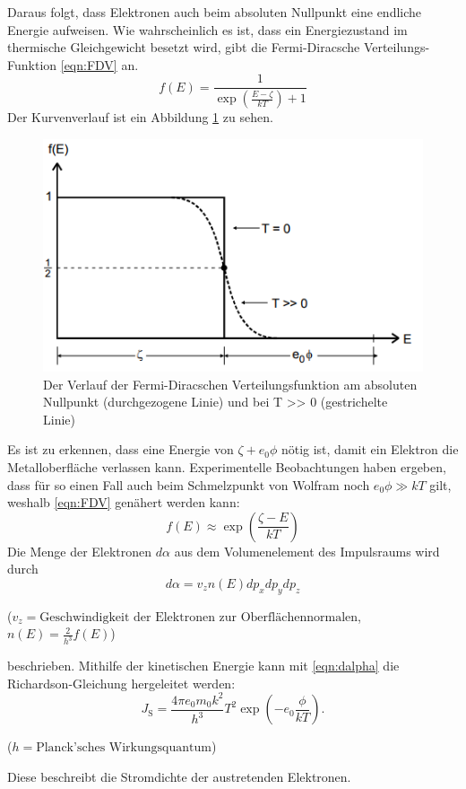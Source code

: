 Daraus folgt, dass Elektronen auch beim absoluten Nullpunkt eine endliche Energie aufweisen.
Wie wahrscheinlich es ist, dass ein Energiezustand im thermische Gleichgewicht besetzt wird, gibt die Fermi-Diracsche Verteilungs-Funktion \eqref{eqn:FDV} an.
\begin{equation}
  f(E)=\frac{1}{\exp{\left(\frac{E-\zeta}{kT}\right)+1}} \label{eqn:FDV}
\end{equation}
Der Kurvenverlauf ist ein Abbildung \ref{fig:KVL} zu sehen.
\begin{figure}[H]
  \includegraphics{Text/Bilder/kurvenverlauf.png}
  \caption{Der Verlauf der Fermi-Diracschen Verteilungsfunktion am absoluten Nullpunkt (durchgezogene
Linie) und bei T >> 0 (gestrichelte Linie) \cite[94]{sample} }
  \label{fig:KVL}
\end{figure}
Es ist zu erkennen, dass eine Energie von $\zeta+e_0 \phi$ nötig ist, damit ein Elektron die Metalloberfläche verlassen kann. Experimentelle Beobachtungen haben ergeben, dass für so einen Fall auch beim Schmelzpunkt von Wolfram noch
$e_0 \phi \gg kT$ gilt, weshalb \eqref{eqn:FDV} genähert werden kann:
\begin{equation}
    f(E) \approx \exp{\left(\frac{\zeta-E}{kT}\right)}
\end{equation}
Die Menge der Elektronen $d\alpha$ aus dem Volumenelement des Impulsraums wird durch
\begin{equation}
  d \alpha = v_z n(E) dp_x dp_y dp_z \label{eqn:dalpha}
\end{equation}
\begin{center}
 \tiny {($v_z=\text{Geschwindigkeit der Elektronen zur Oberflächennormalen}$,  $n(E)=\frac{2}{h^{3}}f(E)$)}
\end{center}
beschrieben. Mithilfe der kinetischen Energie kann mit \eqref{eqn:dalpha} die Richardson-Gleichung hergeleitet werden:
\begin{equation}
   	J_\text{S} =  \frac{4 \pi e_0 m_0 k^2}{h^3} T^2 \exp\left(-e_0 \frac{\phi}{k T}\right)\text{.} \label{eq:Richardson-Gleichung}
\end{equation}
\begin{center}
 \tiny {($h=\text{Planck'sches Wirkungsquantum}$)}
\end{center}
Diese beschreibt die Stromdichte der austretenden Elektronen.

